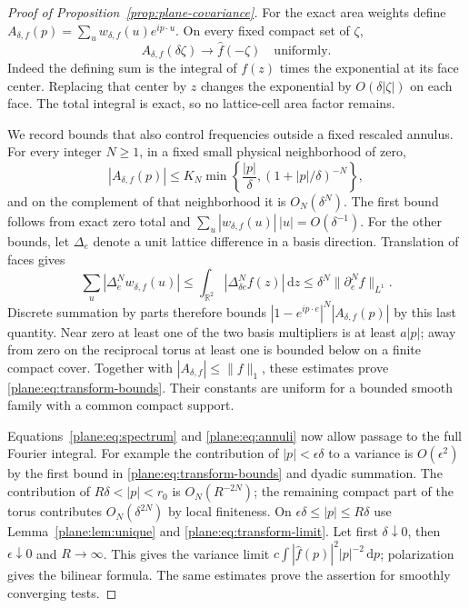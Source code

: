\documentclass[11pt]{article}
\theoremstyle{definition}
\theoremstyle{remark}
\numberwithin{equation}{section}
\begin{document}
\begin{proof}[Proof of Proposition~\ref{prop:plane-covariance}]
For the exact area weights define
$A_{\delta,f}(p)=\sum_uw_{\delta,f}(u)e^{ip\cdot u}$.
On every fixed compact set of $\zeta$,
\begin{equation}
 \label{plane:eq:transform-limit}
 A_{\delta,f}(\delta\zeta)\longrightarrow\widehat f(-\zeta)
 \quad\text{uniformly}.
\end{equation}
Indeed the defining sum is the integral of $f(z)$ times the
exponential at its face center.  Replacing that center by $z$
changes the exponential by $O(\delta|\zeta|)$ on each face.
The total integral is exact, so no lattice-cell area factor remains.

We record bounds that also control frequencies outside a fixed
rescaled annulus.  For every integer $N\ge1$, in a fixed small
physical neighborhood of zero,
\begin{equation}
 \label{plane:eq:transform-bounds}
 |A_{\delta,f}(p)|\le K_N
       \min\left\{\frac{|p|}{\delta},
                    (1+|p|/\delta)^{-N}\right\},
\end{equation}
and on the complement of that neighborhood it is $O_N(\delta^N)$.
The first bound follows from exact zero total and
$\sum_u|w_{\delta,f}(u)|\,|u|=O(\delta^{-1})$.
For the other bounds, let $\Delta_e$ denote a unit lattice difference
in a basis direction.  Translation of faces gives
\[
 \sum_u|\Delta_e^Nw_{\delta,f}(u)|
   \le\int_{\mathbb R^2}|\Delta_{\delta e}^N f(z)|\,\mathrm d z
   \le\delta^N\|\partial_e^N f\|_{L^1}.
\]
Discrete summation by parts therefore bounds
$|1-e^{ip\cdot e}|^N|A_{\delta,f}(p)|$ by this last quantity.
Near zero at least one of the two basis multipliers is at least
$a|p|$; away from zero on the reciprocal torus at least one is bounded
below on a finite compact cover.  Together with
$|A_{\delta,f}|\le\|f\|_1$, these estimates prove
\eqref{plane:eq:transform-bounds}.  Their constants are uniform for
a bounded smooth family with a common compact support.

Equations~\eqref{plane:eq:spectrum} and
\eqref{plane:eq:annuli} now allow passage to the full Fourier integral.
For example the contribution of $|p|<\epsilon\delta$ to a variance
is $O(\epsilon^2)$ by the first bound in
\eqref{plane:eq:transform-bounds} and dyadic summation.
The contribution of $R\delta<|p|<r_0$ is $O_N(R^{-2N})$;
the remaining compact part of the torus contributes $O_N(\delta^{2N})$
by local finiteness.  On $\epsilon\delta\le|p|\le R\delta$ use
Lemma~\ref{plane:lem:unique} and \eqref{plane:eq:transform-limit}.
Let first $\delta\downarrow0$, then $\epsilon\downarrow0$ and
$R\to\infty$.  This gives the variance limit
$c\int|\widehat f(p)|^2|p|^{-2}\,\mathrm d p$; polarization gives the
bilinear formula.  The same estimates prove the assertion for
smoothly converging tests.


\end{proof}
\end{document}
